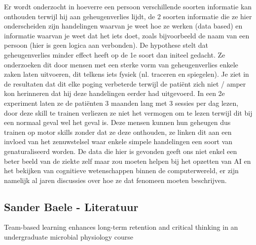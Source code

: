 \documentclass{voorstel}
\begin{document}
	Er wordt onderzocht in hoeverre een persoon verschillende soorten informatie kan onthouden terwijl hij aan geheugenverlies lijdt, de 2 soorten informatie die ze hier onderscheiden zijn
	handelingen waarvan je weet hoe ze werken (data based) en informatie waarvan je weet dat het iets doet, zoals bijvoorbeeld de naam van een persoon (hier is geen logica aan verbonden).
	De hypothese stelt dat geheugenverlies minder effect heeft op de 1e soort dan initeel gedacht. Ze onderzoeken dit door mensen met een sterke vorm van geheugenverlies enkele zaken laten
	uitvoeren, dit telkens iets fysiek (nl. traceren en spiegelen). Je ziet in de resultaten dat dit elke poging verbeterde terwijl de patiënt zich niet / amper kon herinneren dat hij deze 
	handelingen eerder had uitgevoerd. In een 2e experiment laten ze de patiënten 3 maanden lang met 3 sessies per dag lezen, door deze skill te trainen verliezen ze niet het vermogen om te
	lezen terwijl dit bij een normaal geval wel het geval is. Deze mensen kunnen hun geheugen dus trainen op motor skills zonder dat ze deze onthouden, ze linken dit aan een invloed van het
	zenuwstelsel waar enkele simpele handelingen een soort van genaturaliseerd worden. De data die hier is gevonden geeft ons niet enkel een beter beeld van de ziekte zelf maar zou moeten
	helpen bij het opzetten van AI en het bekijken van cognitieve wetenschappen binnen de computerwereld, er zijn namelijk al jaren discussies over hoe ze dat fenomeen moeten beschrijven.
	
	\subsection{Sander Baele - Literatuur}
	Team-based learning enhances long-term retention and critical thinking in an undergraduate microbial physiology course \autocite{Mcinerney2003}
	
\end{document}
